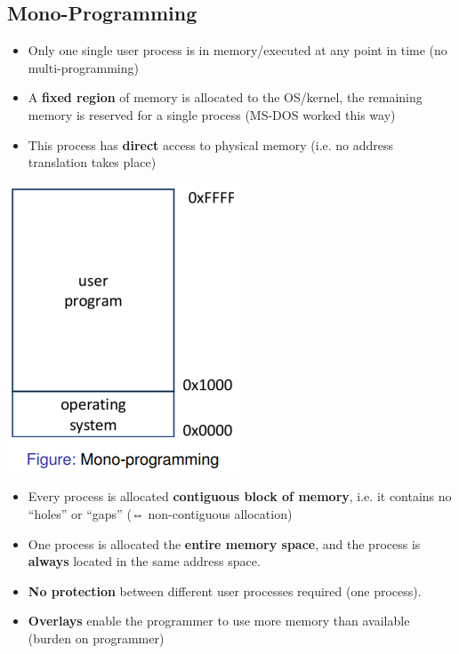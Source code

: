 \documentclass{article}
\begin{document}
\subsection{Mono-Programming}
\begin{multicols}{2}

\begin{itemize}
	\item Only one single user process is in memory/executed at any point in time (no multi-programming)
	\item A \textbf{fixed region} of memory is allocated to the OS/kernel, the remaining memory is reserved for a single process (MS-DOS worked this way)
	\item This process has \textbf{direct} access to physical memory (i.e. no address translation takes place)
\end{itemize}

\includegraphics[scale=0.5]{Selection_001.png}
\end{multicols}

\begin{itemize}
	\item Every process is allocated \textbf{contiguous block of memory}, i.e. it contains no “holes” or “gaps” (⇔ non-contiguous allocation)
	\item One process is allocated the \textbf{entire memory space}, and the process is \textbf{always} located in the same address space.
	\item \textbf{No protection} between different user processes required (one process).
	\item \textbf{Overlays} enable the programmer to use more memory than available (burden on programmer)
\end{itemize}
\end{document}
